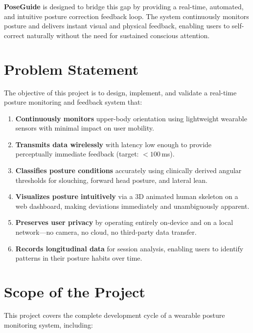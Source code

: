 \documentclass[12pt,a4paper]{report}
\begin{document}
\textbf{PoseGuide} is designed to bridge this gap by providing a real-time, automated, and intuitive posture correction feedback loop. The system continuously monitors posture and delivers instant visual and physical feedback, enabling users to self-correct naturally without the need for sustained conscious attention.

\section{Problem Statement}

The objective of this project is to design, implement, and validate a real-time posture monitoring and feedback system that:

\begin{enumerate}[leftmargin=2em]
    \item \textbf{Continuously monitors} upper-body orientation using lightweight wearable sensors with minimal impact on user mobility.
    \item \textbf{Transmits data wirelessly} with latency low enough to provide perceptually immediate feedback (target: $< 100$\,ms).
    \item \textbf{Classifies posture conditions} accurately using clinically derived angular thresholds for slouching, forward head posture, and lateral lean.
    \item \textbf{Visualizes posture intuitively} via a 3D animated human skeleton on a web dashboard, making deviations immediately and unambiguously apparent.
    \item \textbf{Preserves user privacy} by operating entirely on-device and on a local network—no camera, no cloud, no third-party data transfer.
    \item \textbf{Records longitudinal data} for session analysis, enabling users to identify patterns in their posture habits over time.
\end{enumerate}

\section{Scope of the Project}

This project covers the complete development cycle of a wearable posture monitoring system, including:
\end{document}
